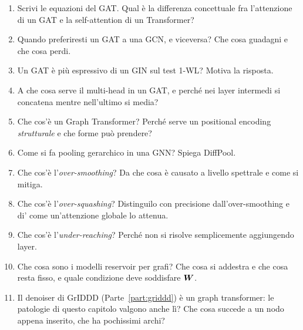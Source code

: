 \begin{tcolorbox}[mywarn, title={Domande d'esame — Graph attention, transformer e patologie}]
\begin{enumerate}
  \item Scrivi le equazioni del GAT. Qual è la differenza concettuale fra l'attenzione di un GAT e la self-attention di un Transformer?
  \item Quando preferiresti un GAT a una GCN, e viceversa? Che cosa guadagni e che cosa perdi.
  \item Un GAT è più espressivo di un GIN sul test 1-WL? Motiva la risposta.
  \item A che cosa serve il multi-head in un GAT, e perché nei layer intermedi si concatena mentre nell'ultimo si media?
  \item Che cos'è un Graph Transformer? Perché serve un positional encoding \emph{strutturale} e che forme può prendere?
  \item Come si fa pooling gerarchico in una GNN? Spiega DiffPool.
  \item Che cos'è l'\emph{over-smoothing}? Da che cosa è causato a livello spettrale e come si mitiga.
  \item Che cos'è l'\emph{over-squashing}? Distinguilo con precisione dall'over-smoothing e di' come un'attenzione globale lo attenua.
  \item Che cos'è l'\emph{under-reaching}? Perché non si risolve semplicemente aggiungendo layer.
  \item Che cosa sono i modelli reservoir per grafi? Che cosa si addestra e che cosa resta fisso, e quale condizione deve soddisfare $\bm{W}$.
  \item Il denoiser di GrIDDD (Parte~\ref{part:griddd}) è un graph transformer: le patologie di questo capitolo valgono anche lì? Che cosa succede a un nodo appena inserito, che ha pochissimi archi?
\end{enumerate}
\end{tcolorbox}
